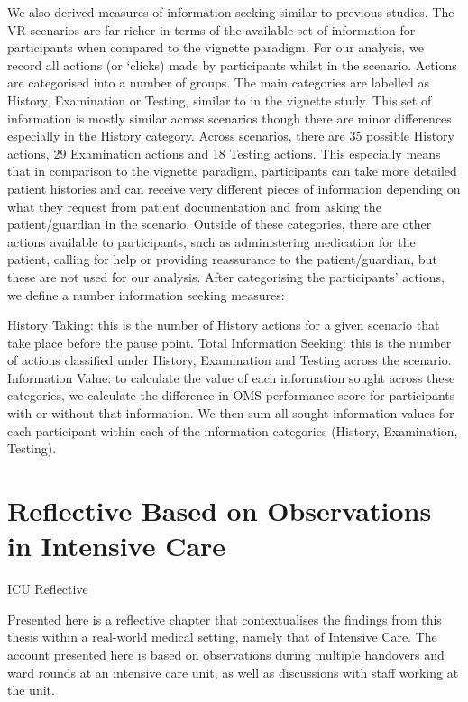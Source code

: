 \documentclass[a4paper, nobind]{templates/ociamthesis}
\begin{document}
We also derived measures of information seeking similar to previous studies. The VR scenarios are far richer in terms of the available set of information for participants when compared to the vignette paradigm. For our analysis, we record all actions (or `clicks) made by participants whilst in the scenario. Actions are categorised into a number of groups. The main categories are labelled as History, Examination or Testing, similar to in the vignette study. This set of information is mostly similar across scenarios though there are minor differences especially in the History category. Across scenarios, there are 35 possible History actions, 29 Examination actions and 18 Testing actions. This especially means that in comparison to the vignette paradigm, participants can take more detailed patient histories and can receive very different pieces of information depending on what they request from patient documentation and from asking the patient/guardian in the scenario. Outside of these categories, there are other actions available to participants, such as administering medication for the patient, calling for help or providing reassurance to the patient/guardian, but these are not used for our analysis. After categorising the participants' actions, we define a number information seeking measures:

History Taking: this is the number of History actions for a given scenario that take place before the pause point.
Total Information Seeking: this is the number of actions classified under History, Examination and Testing across the scenario.
Information Value: to calculate the value of each information sought across these categories, we calculate the difference in OMS performance score for participants with or without that information. We then sum all sought information values for each participant within each of the information categories (History, Examination, Testing).

\hypertarget{reflective-based-on-observations-in-intensive-care}{%
\chapter*{Reflective Based on Observations in Intensive Care}\label{reflective-based-on-observations-in-intensive-care}}

\adjustmtc
{}

ICU Reflective

Presented here is a reflective chapter that contextualises the findings from this thesis within a real-world medical setting, namely that of Intensive Care. The account presented here is based on observations during multiple handovers and ward rounds at an intensive care unit, as well as discussions with staff working at the unit.
\end{document}
